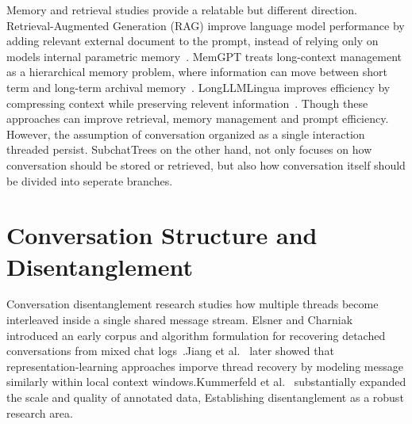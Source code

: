 Memory and retrieval studies provide a relatable but different direction. Retrieval-Augmented Generation (RAG) improve language model performance by adding relevant external document to the prompt, instead of relying only on models internal parametric memory~\cite{lewis2020rag}. MemGPT treats long-context management as a hierarchical memory problem, where information can move between short term and long-term archival memory~\cite{packer2023memgpt}. LongLLMLingua improves efficiency by compressing context while preserving relevent information~\cite{jiang2024longllmlingua}. Though these approaches can improve retrieval, memory management and prompt efficiency. However, the assumption of conversation organized as a single interaction threaded persist. SubchatTrees on the other hand, not only focuses on how conversation should be stored or retrieved, but also how conversation itself should be divided into seperate branches.






\section{Conversation Structure and Disentanglement}\label{subsec:disentangle}



Conversation disentanglement research studies how multiple threads become interleaved inside a single shared message stream. Elsner and Charniak introduced an early corpus and algorithm formulation for recovering detached conversations from mixed chat logs~\cite{elsner2008talking}.Jiang et al.~\cite{jiang2018disentangle} later showed that representation-learning approaches imporve thread recovery by modeling message similarly within local context windows.Kummerfeld et al.~\cite{kummerfeld2019disentanglement} substantially expanded the scale and quality of annotated data, Establishing disentanglement as a robust research area.





